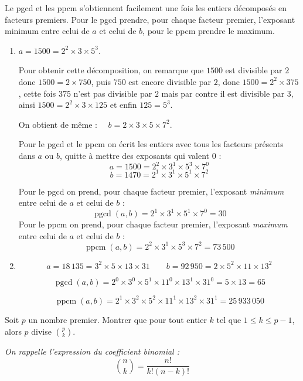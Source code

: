 \documentclass[11pt,class=report,crop=false]{standalone}
\newcommand{\pgcd}{\mathop{\mathrm{pgcd}}\nolimits}
\newcommand{\ppcm}{\mathop{\mathrm{ppcm}}\nolimits}
\begin{document}
\indication
Le pgcd et les ppcm s'obtiennent facilement une fois les entiers décomposés en facteurs premiers.
Pour le pgcd prendre, pour chaque facteur premier, l'exposant minimum entre celui de $a$ et celui de $b$, pour le ppcm prendre le maximum.
\finindication

\correction
\sauteligne
\begin{enumerate}
    \item     
    $a=1500 = 2^2 \times 3 \times 5^3$.
    
    Pour obtenir cette décomposition, on remarque que $1500$ est divisible par $2$ donc
    $1500 = 2 \times 750$, puis $750$ est encore divisible par $2$, donc $1500 = 2^2 \times 375$, cette fois $375$ n'est pas divisible par $2$ mais par contre il est divisible par $3$, ainsi $1500 = 2^2 \times 3 \times 125$ et enfin $125=5^3$.
    
    On obtient de même : $\quad b = 2\times 3 \times 5 \times 7^2$.
    
    Pour le pgcd et le ppcm on écrit les entiers avec tous les facteurs présents dans $a$ ou $b$, quitte à mettre des exposants qui valent $0$ :
    $$a=1500 = 2^2 \times 3^1 \times 5^3  \times 7^0$$
    $$b = 1470 = 2^1\times 3^1 \times 5^1 \times 7^2$$
    
    Pour le pgcd on prend, pour chaque facteur premier, l'exposant \emph{minimum} entre celui de $a$ et celui de $b$ :
    $$\pgcd(a,b)=2^1\times 3^1 \times 5^1 \times 7^0 = 30$$
    Pour le ppcm on prend, pour chaque facteur premier, l'exposant \emph{maximum} entre celui de $a$ et celui de $b$ :
    $$\ppcm(a,b)=2^2\times 3^1 \times 5^3 \times 7^2 = 73\,500$$    
    
    \item
    $$a = 18\,135 = 3^2 \times 5 \times 13 \times 31 \qquad b = 92\,950 = 2 \times 5^2 \times 11 \times 13^2$$
    
    $$\pgcd(a,b)=2^0\times 3^0 \times 5^1 \times 11^0 \times 13^1 \times 31^0 = 5 \times 13 =65$$
     
    $$\ppcm(a,b)=2^1\times 3^2 \times 5^2 \times 11^1 \times 13^2 \times 31^1 = 25\,933\,050$$   
   
\end{enumerate}
\fincorrection
\finexercice



\exercice{}
\enonce
Soit $p$ un nombre premier. Montrer que pour tout entier $k$ tel que $1 \leq k \leq p-1$, alors $p$ divise $\binom{p}{k}$.

\textit{On rappelle l'expression du coefficient binomial :}
$$ \binom{n}{k} = \frac{n!}{k!(n-k)!}$$
\finenonce
\end{document}
